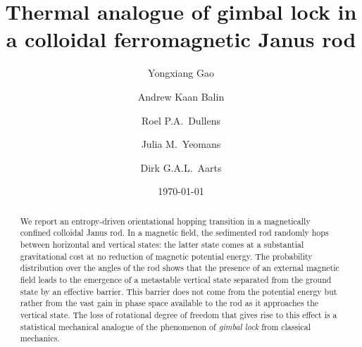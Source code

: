 \documentclass[aps,prl,reprint,twocolumn,superscriptaddress,showpacs]{revtex4-1}
\begin{document}
\title{Thermal analogue of gimbal lock in a colloidal ferromagnetic Janus rod}

\author{Yongxiang Gao}
\author{Andrew Kaan Balin}
\author{Roel P.A.\ Dullens}
\author{Julia M.\ Yeomans}
\author{Dirk G.A.L.\ Aarts}


\date{\today}

\begin{abstract} We report an entropy-driven orientational hopping transition in a magnetically confined colloidal Janus rod. In a magnetic field, the sedimented rod randomly hops between horizontal and vertical states: the latter state comes at a substantial gravitational cost at no reduction of magnetic potential energy. The probability distribution over the angles of the rod shows that the presence of an external magnetic field leads to the emergence of a metastable vertical state separated from the ground state by an effective barrier. This barrier does not come from the potential energy but rather from the vast gain in phase space available to the rod as it approaches the vertical state. The loss of rotational degree of freedom that gives rise to this effect is a statistical mechanical analogue of the phenomenon of \emph{gimbal lock} from classical mechanics.\end{abstract}





\maketitle
\end{document}
